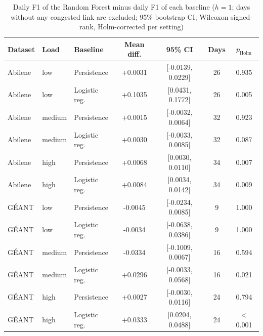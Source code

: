 \begin{table}[t]
\centering
\caption{Daily F1 of the Random Forest minus daily F1 of each baseline ($h=1$; days without any congested link are excluded; 95\% bootstrap CI; Wilcoxon signed-rank, Holm-corrected per setting)}
\label{tab:predstats}
\scriptsize
\begin{tabular}{@{}lllcccc@{}}
\toprule
Dataset & Load & Baseline & Mean diff. & 95\% CI & Days & $p_{\mathrm{Holm}}$ \\
\midrule
Abilene & low & Persistence & +0.0031 & [-0.0139, 0.0229] & 26 & 0.935 \\
Abilene & low & Logistic reg. & +0.1035 & [0.0431, 0.1772] & 26 & 0.005 \\
Abilene & medium & Persistence & +0.0015 & [-0.0032, 0.0064] & 32 & 0.923 \\
Abilene & medium & Logistic reg. & +0.0030 & [-0.0033, 0.0085] & 32 & 0.087 \\
Abilene & high & Persistence & +0.0068 & [0.0030, 0.0110] & 34 & 0.007 \\
Abilene & high & Logistic reg. & +0.0084 & [0.0034, 0.0142] & 34 & 0.009 \\
G\'EANT & low & Persistence & -0.0045 & [-0.0234, 0.0085] & 9 & 1.000 \\
G\'EANT & low & Logistic reg. & -0.0034 & [-0.0638, 0.0386] & 9 & 1.000 \\
G\'EANT & medium & Persistence & -0.0334 & [-0.1009, 0.0067] & 16 & 0.594 \\
G\'EANT & medium & Logistic reg. & +0.0296 & [-0.0033, 0.0568] & 16 & 0.021 \\
G\'EANT & high & Persistence & +0.0027 & [-0.0030, 0.0116] & 24 & 0.794 \\
G\'EANT & high & Logistic reg. & +0.0333 & [0.0204, 0.0488] & 24 & $<$0.001 \\
\bottomrule
\end{tabular}
\end{table}
